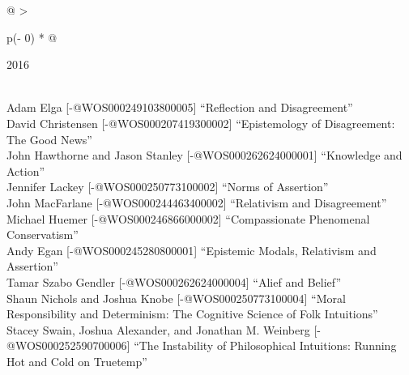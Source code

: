 \documentclass[
  10pt,
  letterpaper,
  DIV=11,
  numbers=noendperiod,
  twoside]{scrartcl}
\begin{document}
\begin{longtable}[]{@{}
  >{\raggedright\arraybackslash}p{(\columnwidth - 0\tabcolsep) * }@{}}

\caption{\label{tbl-top-ten-2007}Most cited articles published less than
ten years ago as of 2016.}

\tabularnewline

\toprule\noalign{}
\begin{minipage}[b]{\linewidth}\raggedright
2016
\end{minipage} \\
\midrule\noalign{}
\endhead
\bottomrule\noalign{}
\endlastfoot
Adam Elga {[}-@WOS000249103800005{]} ``Reflection and Disagreement'' \\
David Christensen {[}-@WOS000207419300002{]} ``Epistemology of
Disagreement: The Good News'' \\
John Hawthorne and Jason Stanley {[}-@WOS000262624000001{]} ``Knowledge
and Action'' \\
Jennifer Lackey {[}-@WOS000250773100002{]} ``Norms of Assertion'' \\
John MacFarlane {[}-@WOS000244463400002{]} ``Relativism and
Disagreement'' \\
Michael Huemer {[}-@WOS000246866000002{]} ``Compassionate Phenomenal
Conservatism'' \\
Andy Egan {[}-@WOS000245280800001{]} ``Epistemic Modals, Relativism and
Assertion'' \\
Tamar Szabo Gendler {[}-@WOS000262624000004{]} ``Alief and Belief'' \\
Shaun Nichols and Joshua Knobe {[}-@WOS000250773100004{]} ``Moral
Responsibility and Determinism: The Cognitive Science of Folk
Intuitions'' \\
Stacey Swain, Joshua Alexander, and Jonathan M. Weinberg
{[}-@WOS000252590700006{]} ``The Instability of Philosophical
Intuitions: Running Hot and Cold on Truetemp'' \\

\end{longtable}
\end{document}

